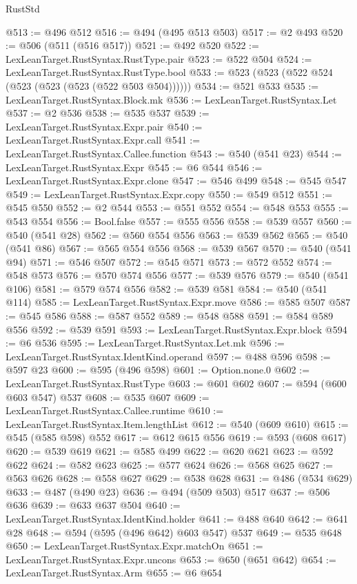 \begin{lexlean}{RustStd}
\begin{coremodule}
@513 := @496 @512
@516 := @494 (@495 @513 @503)
@517 := @2 @493
@520 := @506 (@511 (@516 @517))
@521 := @492 @520
@522 := LexLeanTarget.RustSyntax.RustType.pair
@523 := @522 @504
@524 := LexLeanTarget.RustSyntax.RustType.bool
@533 := @523 (@523 (@522 @524 (@523 (@523 (@523 (@522 @503 @504))))))
@534 := @521 @533
@535 := LexLeanTarget.RustSyntax.Block.mk
@536 := LexLeanTarget.RustSyntax.Let
@537 := @2 @536
@538 := @535 @537
@539 := LexLeanTarget.RustSyntax.Expr.pair
@540 := LexLeanTarget.RustSyntax.Expr.call
@541 := LexLeanTarget.RustSyntax.Callee.function
@543 := @540 (@541 @23)
@544 := LexLeanTarget.RustSyntax.Expr
@545 := @6 @544
@546 := LexLeanTarget.RustSyntax.Expr.clone
@547 := @546 @499
@548 := @545 @547
@549 := LexLeanTarget.RustSyntax.Expr.copy
@550 := @549 @512
@551 := @545 @550
@552 := @2 @544
@553 := @551 @552
@554 := @548 @553
@555 := @543 @554
@556 := Bool.false
@557 := @555 @556
@558 := @539 @557
@560 := @540 (@541 @28)
@562 := @560 @554 @556
@563 := @539 @562
@565 := @540 (@541 @86)
@567 := @565 @554 @556
@568 := @539 @567
@570 := @540 (@541 @94)
@571 := @546 @507
@572 := @545 @571
@573 := @572 @552
@574 := @548 @573
@576 := @570 @574 @556
@577 := @539 @576
@579 := @540 (@541 @106)
@581 := @579 @574 @556
@582 := @539 @581
@584 := @540 (@541 @114)
@585 := LexLeanTarget.RustSyntax.Expr.move
@586 := @585 @507
@587 := @545 @586
@588 := @587 @552
@589 := @548 @588
@591 := @584 @589 @556
@592 := @539 @591
@593 := LexLeanTarget.RustSyntax.Expr.block
@594 := @6 @536
@595 := LexLeanTarget.RustSyntax.Let.mk
@596 := LexLeanTarget.RustSyntax.IdentKind.operand
@597 := @488 @596
@598 := @597 @23
@600 := @595 (@496 @598)
@601 := Option.none.{0}
@602 := LexLeanTarget.RustSyntax.RustType
@603 := @601 @602
@607 := @594 (@600 @603 @547) @537
@608 := @535 @607
@609 := LexLeanTarget.RustSyntax.Callee.runtime
@610 := LexLeanTarget.RustSyntax.Item.lengthList
@612 := @540 (@609 @610)
@615 := @545 (@585 @598) @552
@617 := @612 @615 @556
@619 := @593 (@608 @617)
@620 := @539 @619
@621 := @585 @499
@622 := @620 @621
@623 := @592 @622
@624 := @582 @623
@625 := @577 @624
@626 := @568 @625
@627 := @563 @626
@628 := @558 @627
@629 := @538 @628
@631 := @486 (@534 @629)
@633 := @487 (@490 @23)
@636 := @494 (@509 @503) @517
@637 := @506 @636
@639 := @633 @637 @504
@640 := LexLeanTarget.RustSyntax.IdentKind.holder
@641 := @488 @640
@642 := @641 @28
@648 := @594 (@595 (@496 @642) @603 @547) @537
@649 := @535 @648
@650 := LexLeanTarget.RustSyntax.Expr.matchOn
@651 := LexLeanTarget.RustSyntax.Expr.uncons
@653 := @650 (@651 @642)
@654 := LexLeanTarget.RustSyntax.Arm
@655 := @6 @654

\end{coremodule}
\end{lexlean}
